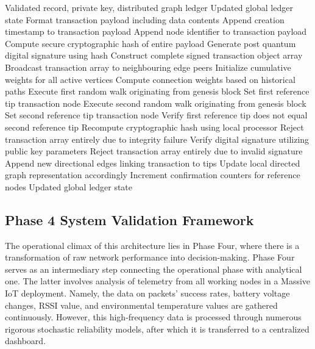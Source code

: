 \documentclass[a4paper,fleqn]{cas-dc}
\numberwithin{equation}{section}
\begin{document}
\begin{algorithm}[!ht]
\caption{Post Quantum Ledger Consensus Integration}
\label{alg:ledger}
\begin{algorithmic}[1]
\renewcommand{\algorithmicrequire}{\textbf{Input:}}
\renewcommand{\algorithmicensure}{\textbf{Output:}}
\REQUIRE Validated record, private key, distributed graph ledger
\ENSURE Updated global ledger state
\STATE Format transaction payload including data contents
\STATE Append creation timestamp to transaction payload
\STATE Append node identifier to transaction payload
\STATE Compute secure cryptographic hash of entire payload
\STATE Generate post quantum digital signature using hash
\STATE Construct complete signed transaction object array
\STATE Broadcast transaction array to neighbouring edge peers
\STATE Initialize cumulative weights for all active vertices
\STATE Compute connection weights based on historical paths
\STATE Execute first random walk originating from genesis block
\STATE Set first reference tip transaction node
\STATE Execute second random walk originating from genesis block
\STATE Set second reference tip transaction node
\STATE Verify first reference tip does not equal second reference tip
\STATE Recompute cryptographic hash using local processor
\STATE Reject transaction array entirely due to integrity failure
\ELSE
\STATE Verify digital signature utilizing public key parameters
\STATE Reject transaction array entirely due to invalid signature
\ELSE
\STATE Append new directional edges linking transaction to tips
\STATE Update local directed graph representation accordingly
\STATE Increment confirmation counters for reference nodes
\ENDIF
\ENDIF
\ENDFOR
\RETURN Updated global ledger state
\end{algorithmic}
\end{algorithm}


\subsection{Phase 4 System Validation Framework}

The operational climax of this architecture lies in Phase Four, where there is a transformation of raw network performance into decision-making. Phase Four serves as an intermediary step connecting the operational phase with analytical one. The latter involves analysis of telemetry from all working nodes in a Massive IoT deployment. Namely, the data on packets' success rates, battery voltage changes, RSSI value, and environmental temperature values are gathered continuously. However, this high-frequency data is processed through numerous rigorous stochastic reliability models, after which it is transferred to a centralized dashboard. 
\end{document}
